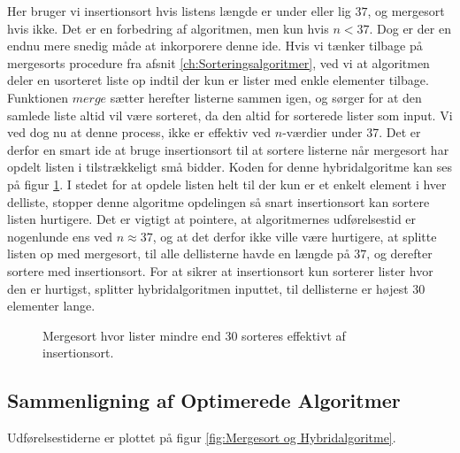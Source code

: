 Her bruger vi insertionsort hvis listens længde er under eller lig $37$, og mergesort hvis ikke. Det er en forbedring af algoritmen, men kun hvis $n < 37$. Dog er der en endnu mere snedig måde at inkorporere denne ide. Hvis vi tænker tilbage på mergesorts procedure fra afsnit \ref{ch:Sorteringsalgoritmer}, ved vi at algoritmen deler en usorteret liste op indtil der kun er lister med enkle elementer tilbage. Funktionen $merge$ sætter herefter listerne sammen igen, og sørger for at den samlede liste altid vil være sorteret, da den altid for sorterede lister som input. Vi ved dog nu at denne process, ikke er effektiv ved $n$-værdier under 37. Det er derfor en smart ide at bruge insertionsort til at sortere listerne når mergesort har opdelt listen i tilstrækkeligt små bidder. Koden for denne hybridalgoritme kan ses på figur \ref{fig:hybridalgoritme i Python}. I stedet for at opdele listen helt til der kun er et enkelt element i hver delliste, stopper denne algoritme opdelingen så snart insertionsort kan sortere listen hurtigere. Det er vigtigt at pointere, at algoritmernes udførelsestid er nogenlunde ens ved $n \approx 37$, og at det derfor ikke ville være hurtigere, at splitte listen op med mergesort, til alle dellisterne havde en længde på $37$, og derefter sortere med insertionsort. For at sikrer at insertionsort kun sorterer lister hvor den er hurtigst, splitter hybridalgoritmen inputtet, til dellisterne er højest $30$ elementer lange.



\begin{figure}
	\begin{center}
		
	\end{center}
	\caption{Mergesort hvor lister mindre end 30 sorteres effektivt af insertionsort.}
	\label{fig:hybridalgoritme i Python}
\end{figure}




\subsection{Sammenligning af Optimerede Algoritmer}%
\label{sub:Sammenligning af Optimerede Algoritmer}

Udførelsestiderne er plottet på figur \ref{fig:Mergesort og Hybridalgoritme}.\\

